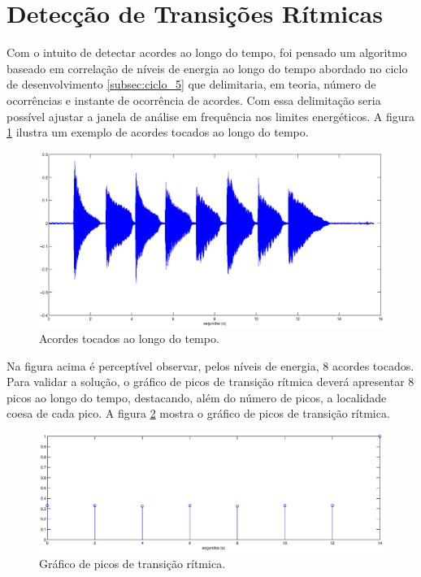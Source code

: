 \section{Detecção de Transições Rítmicas}

Com o intuito de detectar acordes ao longo do tempo, foi pensado um algoritmo baseado em correlação de níveis de energia ao longo do tempo abordado no ciclo de desenvolvimento \ref{subsec:ciclo_5} que delimitaria, em teoria, número de ocorrências e instante de ocorrência de acordes. Com essa delimitação seria possível ajustar a janela de análise em frequência nos limites energéticos. A figura \ref{fig:deteccao_ritmica_1} ilustra um exemplo de acordes tocados ao longo do tempo. 

\begin{figure}[h]
    \centering
    \includegraphics[keepaspectratio=true,scale=0.45]{figuras/deteccao_ritmica_1.eps}
  \caption{Acordes tocados ao longo do tempo.}
  \label{fig:deteccao_ritmica_1}
\end{figure}

Na figura acima é perceptível observar, pelos níveis de energia, 8 acordes tocados. Para validar a solução, o gráfico de picos de transição rítmica deverá apresentar 8 picos ao longo do tempo, destacando, além do número de picos, a localidade coesa de cada pico. A figura \ref{fig:deteccao_ritmica_2} mostra o gráfico de picos de transição rítmica.

\begin{figure}[h]
    \centering
    \includegraphics[keepaspectratio=true,scale=0.45]{figuras/deteccao_ritmica_2.eps}
  \caption{Gráfico de picos de transição rítmica.}
  \label{fig:deteccao_ritmica_2}
\end{figure}

